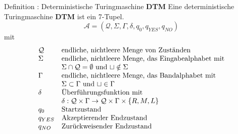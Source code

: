 \documentclass[]{beamer}
\begin{document}
\begin{frame}[squeeze]{}
  \begin{block}{Definition : Deterministische Turingmaschine \textbf{DTM}}
    Eine deterministische Turingmaschine \textbf{DTM} ist ein 7-Tupel.
    \[\mathcal{A} = \left( \mathcal{Q}, \Sigma, \Gamma, \delta, q_0, q_{YES}, q_{NO} \right)\]
    mit
    \[\begin{array}{l l}
        \mathcal{Q} & \text{endliche, nichtleere Menge von Zuständen} \\
        \Sigma      & \text{endliche, nichtleere Menge, das Eingabealphabet mit} \\
                    & \Sigma \cap \mathcal{Q} = \emptyset \text{ und } \sqcup \notin \Sigma \\
        \Gamma      & \text{endliche, nichtleere Menge, das Bandalphabet mit} \\
                    & \Sigma \subset \Gamma \text{ und } \sqcup \in \Gamma \\
        \delta      & \text{Überführungsfunktion mit } \\
                    & \delta : \mathcal{Q} \times \Gamma \rightarrow \mathcal{Q} \times \Gamma \times \{R, M, L\}\\
        q_0         & \text{Startzustand} \\
        q_{YES}     & \text{Akzeptierender Endzustand} \\
        q_{NO}      & \text{Zurückweisender Endzustand}\\
      \end{array}\]
  \end{block}
\end{frame}
\end{document}
